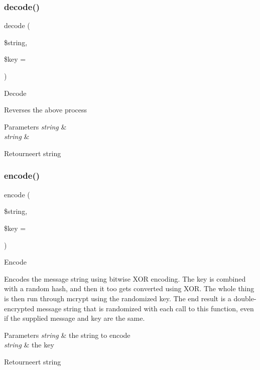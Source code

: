 \subsubsection{\texorpdfstring{decode()}{decode()}}
{\footnotesize\ttfamily decode (\begin{DoxyParamCaption}\item[{}]{\$string,  }\item[{}]{\$key = {\ttfamily \textquotesingle{}\textquotesingle{}} }\end{DoxyParamCaption})}

Decode

Reverses the above process


\begin{DoxyParams}{Parameters}
{\em string} & \\
\hline
{\em string} & \\
\hline
\end{DoxyParams}
\begin{DoxyReturn}{Retourneert}
string 
\end{DoxyReturn}
\mbox{\label{class_c_i___encrypt_a6320fc999db614bc009690cc4867e238}} 
\subsubsection{\texorpdfstring{encode()}{encode()}}
{\footnotesize\ttfamily encode (\begin{DoxyParamCaption}\item[{}]{\$string,  }\item[{}]{\$key = {\ttfamily \textquotesingle{}\textquotesingle{}} }\end{DoxyParamCaption})}

Encode

Encodes the message string using bitwise X\+OR encoding. The key is combined with a random hash, and then it too gets converted using X\+OR. The whole thing is then run through mcrypt using the randomized key. The end result is a double-\/encrypted message string that is randomized with each call to this function, even if the supplied message and key are the same.


\begin{DoxyParams}{Parameters}
{\em string} & the string to encode \\
\hline
{\em string} & the key \\
\hline
\end{DoxyParams}
\begin{DoxyReturn}{Retourneert}
string 
\end{DoxyReturn}
\mbox{\label{class_c_i___encrypt_a74e58407a40ff1f3d030a2065cf10182}} 
